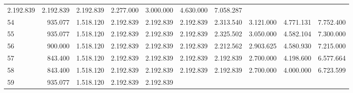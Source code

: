 \begin{tabular}{llllllllll}
  \multicolumn{1}{r}{2.192.839} &
  \multicolumn{1}{r}{2.192.839} &
  \multicolumn{1}{r}{2.192.839} &
  \multicolumn{1}{r}{2.277.000} &
  \multicolumn{1}{r}{3.000.000} &
  \multicolumn{1}{r}{4.630.000} &
  \multicolumn{1}{r}{7.058.287} \\
\multicolumn{1}{l}{\hspace{1em}54} &
  \multicolumn{1}{|r}{935.077} &
  \multicolumn{1}{r}{1.518.120} &
  \multicolumn{1}{r}{2.192.839} &
  \multicolumn{1}{r}{2.192.839} &
  \multicolumn{1}{r}{2.192.839} &
  \multicolumn{1}{r}{2.313.540} &
  \multicolumn{1}{r}{3.121.000} &
  \multicolumn{1}{r}{4.771.131} &
  \multicolumn{1}{r}{7.752.400} \\
\multicolumn{1}{l}{\hspace{1em}55} &
  \multicolumn{1}{|r}{935.077} &
  \multicolumn{1}{r}{1.518.120} &
  \multicolumn{1}{r}{2.192.839} &
  \multicolumn{1}{r}{2.192.839} &
  \multicolumn{1}{r}{2.192.839} &
  \multicolumn{1}{r}{2.325.502} &
  \multicolumn{1}{r}{3.050.000} &
  \multicolumn{1}{r}{4.582.104} &
  \multicolumn{1}{r}{7.300.000} \\
\multicolumn{1}{l}{\hspace{1em}56} &
  \multicolumn{1}{|r}{900.000} &
  \multicolumn{1}{r}{1.518.120} &
  \multicolumn{1}{r}{2.192.839} &
  \multicolumn{1}{r}{2.192.839} &
  \multicolumn{1}{r}{2.192.839} &
  \multicolumn{1}{r}{2.212.562} &
  \multicolumn{1}{r}{2.903.625} &
  \multicolumn{1}{r}{4.580.930} &
  \multicolumn{1}{r}{7.215.000} \\
\multicolumn{1}{l}{\hspace{1em}57} &
  \multicolumn{1}{|r}{843.400} &
  \multicolumn{1}{r}{1.518.120} &
  \multicolumn{1}{r}{2.192.839} &
  \multicolumn{1}{r}{2.192.839} &
  \multicolumn{1}{r}{2.192.839} &
  \multicolumn{1}{r}{2.192.839} &
  \multicolumn{1}{r}{2.700.000} &
  \multicolumn{1}{r}{4.198.600} &
  \multicolumn{1}{r}{6.577.664} \\
\multicolumn{1}{l}{\hspace{1em}58} &
  \multicolumn{1}{|r}{843.400} &
  \multicolumn{1}{r}{1.518.120} &
  \multicolumn{1}{r}{2.192.839} &
  \multicolumn{1}{r}{2.192.839} &
  \multicolumn{1}{r}{2.192.839} &
  \multicolumn{1}{r}{2.192.839} &
  \multicolumn{1}{r}{2.700.000} &
  \multicolumn{1}{r}{4.000.000} &
  \multicolumn{1}{r}{6.723.599} \\
\multicolumn{1}{l}{\hspace{1em}59} &
  \multicolumn{1}{|r}{935.077} &
  \multicolumn{1}{r}{1.518.120} &
  \multicolumn{1}{r}{2.192.839} &
  \multicolumn{1}{r}{2.192.839} &

\end{tabular}
